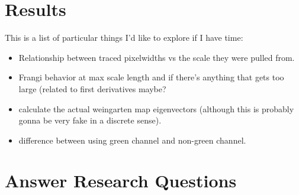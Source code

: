 \section{Results}

This is a list of particular things I'd like to explore if I have time:

\begin{itemize}
	\item Relationship between traced pixelwidths vs the scale they were pulled from.
	\item Frangi behavior at max scale length and if there's anything that gets too large (related to first derivatives maybe?
	\item calculate the actual weingarten map eigenvectors (although this is
	probably gonna be very fake in a discrete sense).
	\item difference between using green channel and non-green channel.
\end{itemize}

\section{Answer Research Questions}
